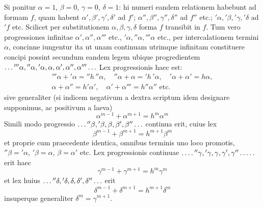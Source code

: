 Si ponitur $\alpha=1$, $\beta=0$, $\gamma=0$, $\delta=1$: hi numeri eandem relationem habebunt ad formam $f$, quam habent $\alpha',\beta',\gamma',\delta'$ ad $f'$; $\alpha'',\beta'',\gamma'',\delta''$ ad $f''$ etc.; ${}'\alpha,{}'\beta,{}'\gamma,{}'\delta$ ad ${}'f$ etc. Scilicet per substitutionem $\alpha,\beta,\gamma,\delta$ forma $f$ transibit in $f$. Tum vero progressiones infinitae $\alpha',\alpha'',\alpha'''$ etc., ${}'\alpha,{}''\alpha,{}'''\alpha$ etc., per intercalationem termini $\alpha$, concinne iungentur ita ut unam continuam utrimque infinitam constituere concipi possint secundum eandem legem ubique progredientem $\mathinner{\ldotp\ldotp\ldotp} {}'''\alpha,{}''\alpha,{}'\alpha,\alpha,\alpha',\alpha'',\alpha'''\mathinner{\ldotp\ldotp\ldotp}$ Lex progressionis haec est:
\[
\begin{gathered}
{}'''\alpha+{}'\alpha={}''h\,{}''\alpha,\quad {}''\alpha+\alpha={}'h\,{}'\alpha,\quad {}'\alpha+\alpha'=h\alpha,\\
\alpha+\alpha''=h'\alpha',\quad \alpha'+\alpha'''=h''\alpha''\text{ etc.}
\end{gathered}
\]
sive generaliter (si indicem negativum a dextra scriptum idem designare supponimus, ac positivum a laeva)
\[
\alpha^{m-1}+\alpha^{m+1}=h^m{\alpha^m}
\]
Simili modo progressio $\mathinner{\ldotp\ldotp\ldotp} {}''\beta,{}'\beta,\beta,\beta',\beta''\mathinner{\ldotp\ldotp\ldotp}$ continua erit, cuius lex
\[
\beta^{m-1}+\beta^{m+1}=h^{m+1}\beta^m
\]
et proprie cum praecedente identica, omnibus terminis uno loco promotis, ${}''\beta={}'\alpha$, ${}'\beta=\alpha$, $\beta=\alpha'$ etc. Lex progressionis continuae $\mathinner{\ldotp\ldotp\ldotp\ldotp} {}''\gamma,\allowbreak {}'\gamma,\allowbreak \gamma,\allowbreak \gamma',\allowbreak \gamma''\mathinner{\ldotp\ldotp\ldotp\ldotp\ldotp}$ erit haec
\[
\gamma^{m-1}+\gamma^{m+1}=h^m{\gamma^m}
\]
et lex huius $\mathinner{\ldotp\ldotp\ldotp} {}''\delta,{}'\delta,\delta,\delta',\delta''\mathinner{\ldotp\ldotp\ldotp}$ erit
\[
\delta^{m-1}+\delta^{m+1}=h^{m+1}\delta^m
\]
insuperque generaliter $\delta^m=\gamma^{m+1}$.

